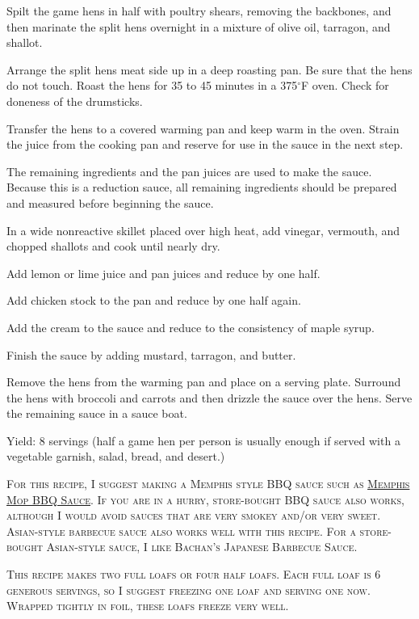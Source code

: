 \documentclass[letterpaper]{recipePMG}
\renewcommand{\deg}{$^\circ$}
\begin{document}
Spilt the game hens in half with poultry shears, removing the backbones, and then marinate the split hens overnight in a mixture of olive oil, tarragon, and shallot.

Arrange the split hens meat side up in a deep roasting pan.  Be sure that the hens do not touch.  Roast the hens for 35 to 45 minutes in a 375\deg F oven. Check for doneness of the drumsticks.

Transfer the hens to a covered warming pan and keep warm in the oven.  Strain the juice from the cooking pan and reserve for use in the sauce in the next step.

The remaining ingredients and the pan juices are used to make the sauce.  Because this is a reduction sauce, all remaining ingredients should be prepared and measured before beginning the sauce.

In a wide nonreactive skillet placed over high heat, add vinegar, vermouth, and chopped shallots and cook until nearly dry.

Add lemon or lime juice and pan juices and reduce by one half.

Add chicken stock to the pan and reduce by one half again.

Add the cream to the sauce and reduce to the consistency of maple syrup.

Finish the sauce by adding mustard, tarragon, and butter.

Remove the hens from the warming pan and place on a serving plate.  Surround the hens with broccoli and carrots and then drizzle the sauce over the hens.  Serve the remaining sauce in a sauce boat.

Yield: 8 servings (half a game hen per person is usually enough if served with a vegetable garnish, salad, bread, and desert.)
 

\newpage


\textsc{For this recipe, I suggest making a Memphis style BBQ sauce such as \hyperref[MemphisMopBBQSauce]{Memphis Mop BBQ Sauce}. If you are in a hurry, store-bought BBQ sauce also works, although I would avoid sauces that are very smokey and/or very sweet. Asian-style barbecue sauce also works well with this recipe. For a store-bought Asian-style sauce, I like Bachan's Japanese Barbecue Sauce.}

\textsc{This recipe makes two full loafs or four half loafs.  Each full loaf is 6 generous servings, so I suggest freezing one loaf and serving one now.  Wrapped tightly in foil, these loafs freeze very well.}
\end{document}
